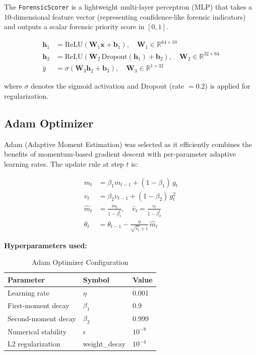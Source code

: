 \documentclass[12pt,a4paper]{article}
\begin{document}
The \texttt{ForensicScorer} is a lightweight multi-layer perceptron (MLP) that
takes a 10-dimensional feature vector (representing confidence-like forensic
indicators) and outputs a scalar forensic priority score in $[0, 1]$.

\begin{align}
  \mathbf{h}_1 &= \text{ReLU}(\mathbf{W}_1 \mathbf{x} + \mathbf{b}_1), \quad
                  \mathbf{W}_1 \in \mathbb{R}^{64 \times 10} \\
  \mathbf{h}_2 &= \text{ReLU}(\mathbf{W}_2 \,\text{Dropout}(\mathbf{h}_1) + \mathbf{b}_2),
                  \quad \mathbf{W}_2 \in \mathbb{R}^{32 \times 64} \\
  \hat{y}      &= \sigma(\mathbf{W}_3 \mathbf{h}_2 + \mathbf{b}_3), \quad
                  \mathbf{W}_3 \in \mathbb{R}^{1 \times 32}
\end{align}

where $\sigma$ denotes the sigmoid activation and Dropout (rate $= 0.2$) is
applied for regularization.

\subsection{Adam Optimizer}

Adam (Adaptive Moment Estimation) was selected as it efficiently combines the
benefits of momentum-based gradient descent with per-parameter adaptive learning
rates. The update rule at step $t$ is:

\begin{align}
  m_t      &= \beta_1 m_{t-1} + (1 - \beta_1)\, g_t \\
  v_t      &= \beta_2 v_{t-1} + (1 - \beta_2)\, g_t^2 \\
  \hat{m}_t &= \frac{m_t}{1 - \beta_1^t}, \quad
  \hat{v}_t  = \frac{v_t}{1 - \beta_2^t} \\
  \theta_t  &= \theta_{t-1} - \frac{\eta}{\sqrt{\hat{v}_t} + \epsilon}\,\hat{m}_t
\end{align}

\textbf{Hyperparameters used:}

\begin{table}[h!]
  \centering
  \caption{Adam Optimizer Configuration}
  \begin{tabular}{lll}
    \toprule
    \textbf{Parameter} & \textbf{Symbol} & \textbf{Value} \\
    \midrule
    Learning rate     & $\eta$          & 0.001 \\
    First-moment decay & $\beta_1$      & 0.9 \\
    Second-moment decay & $\beta_2$     & 0.999 \\
    Numerical stability & $\epsilon$    & $10^{-8}$ \\
    L2 regularization & weight\_decay   & $10^{-4}$ \\
    \bottomrule
  \end{tabular}
\end{table}
\end{document}
